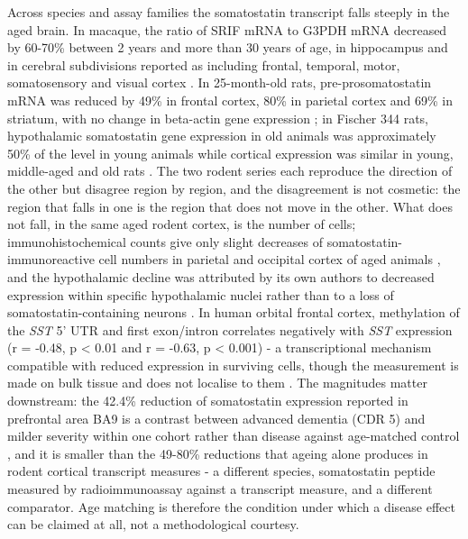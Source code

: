 \documentclass[11pt]{article}
\begin{document}
Across species and assay families the somatostatin transcript falls steeply in the aged brain. In macaque, the ratio of SRIF mRNA to G3PDH mRNA decreased by 60-70\% between 2 years and more than 30 years of age, in hippocampus and in cerebral subdivisions reported as including frontal, temporal, motor, somatosensory and visual cortex \citep{Hayashi1997}. In 25-month-old rats, pre-prosomatostatin mRNA was reduced by 49\% in frontal cortex, 80\% in parietal cortex and 69\% in striatum, with no change in beta-actin gene expression \citep{Florio1991}; in Fischer 344 rats, hypothalamic somatostatin gene expression in old animals was approximately 50\% of the level in young animals while cortical expression was similar in young, middle-aged and old rats \citep{SONNTAG1990}. The two rodent series each reproduce the direction of the other but disagree region by region, and the disagreement is not cosmetic: the region that falls in one is the region that does not move in the other. What does not fall, in the same aged rodent cortex, is the number of cells; immunohistochemical counts give only slight decreases of somatostatin-immunoreactive cell numbers in parietal and occipital cortex of aged animals \citep{Cha1997}, and the hypothalamic decline was attributed by its own authors to decreased expression within specific hypothalamic nuclei rather than to a loss of somatostatin-containing neurons \citep{SONNTAG1990}. In human orbital frontal cortex, methylation of the \emph{SST} 5' UTR and first exon/intron correlates negatively with \emph{SST} expression (r = -0.48, p < 0.01 and r = -0.63, p < 0.001) - a transcriptional mechanism compatible with reduced expression in surviving cells, though the measurement is made on bulk tissue and does not localise to them \citep{McKinney2015}. The magnitudes matter downstream: the 42.4\% reduction of somatostatin expression reported in prefrontal area BA9 is a contrast between advanced dementia (CDR 5) and milder severity within one cohort rather than disease against age-matched control \citep{Poirel2018}, and it is smaller than the 49-80\% reductions that ageing alone produces in rodent cortical transcript measures \citep{Florio1991} - a different species, somatostatin peptide measured by radioimmunoassay against a transcript measure, and a different comparator. Age matching is therefore the condition under which a disease effect can be claimed at all, not a methodological courtesy.
\end{document}
